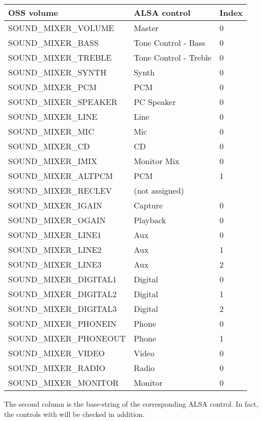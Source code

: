 \documentclass[a4paper,8pt,english]{sphinxmanual}
\begin{document}
\begin{tabulary}{\linewidth}{|L|L|L|}
\hline
\textsf{\relax 
OSS volume
} & \textsf{\relax 
ALSA control
} & \textsf{\relax 
Index
}\\
\hline
SOUND\_MIXER\_VOLUME
 & 
Master
 & 
0
\\
\hline
SOUND\_MIXER\_BASS
 & 
Tone Control - Bass
 & 
0
\\
\hline
SOUND\_MIXER\_TREBLE
 & 
Tone Control - Treble
 & 
0
\\
\hline
SOUND\_MIXER\_SYNTH
 & 
Synth
 & 
0
\\
\hline
SOUND\_MIXER\_PCM
 & 
PCM
 & 
0
\\
\hline
SOUND\_MIXER\_SPEAKER
 & 
PC Speaker
 & 
0
\\
\hline
SOUND\_MIXER\_LINE
 & 
Line
 & 
0
\\
\hline
SOUND\_MIXER\_MIC
 & 
Mic
 & 
0
\\
\hline
SOUND\_MIXER\_CD
 & 
CD
 & 
0
\\
\hline
SOUND\_MIXER\_IMIX
 & 
Monitor Mix
 & 
0
\\
\hline
SOUND\_MIXER\_ALTPCM
 & 
PCM
 & 
1
\\
\hline
SOUND\_MIXER\_RECLEV
 & 
(not assigned)
 & \\
\hline
SOUND\_MIXER\_IGAIN
 & 
Capture
 & 
0
\\
\hline
SOUND\_MIXER\_OGAIN
 & 
Playback
 & 
0
\\
\hline
SOUND\_MIXER\_LINE1
 & 
Aux
 & 
0
\\
\hline
SOUND\_MIXER\_LINE2
 & 
Aux
 & 
1
\\
\hline
SOUND\_MIXER\_LINE3
 & 
Aux
 & 
2
\\
\hline
SOUND\_MIXER\_DIGITAL1
 & 
Digital
 & 
0
\\
\hline
SOUND\_MIXER\_DIGITAL2
 & 
Digital
 & 
1
\\
\hline
SOUND\_MIXER\_DIGITAL3
 & 
Digital
 & 
2
\\
\hline
SOUND\_MIXER\_PHONEIN
 & 
Phone
 & 
0
\\
\hline
SOUND\_MIXER\_PHONEOUT
 & 
Phone
 & 
1
\\
\hline
SOUND\_MIXER\_VIDEO
 & 
Video
 & 
0
\\
\hline
SOUND\_MIXER\_RADIO
 & 
Radio
 & 
0
\\
\hline
SOUND\_MIXER\_MONITOR
 & 
Monitor
 & 
0
\\
\hline\end{tabulary}


The second column is the base-string of the corresponding ALSA
control.  In fact, the controls with  will be checked in addition.
\end{document}
